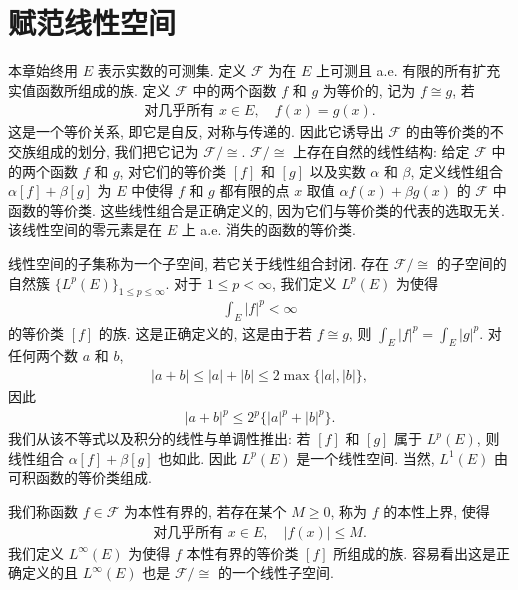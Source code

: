 \documentclass[../../main.tex]{subfiles}
\begin{document}
\section{赋范线性空间}\label{section:ch07-赋范线性空间}

本章始终用 $E$ 表示实数的可测集. 定义 $\mathcal{F}$ 为在 $E$ 上可测且 a.e. 有限的所有扩充实值函数所组成的族. 定义 $\mathcal{F}$ 中的两个函数 $f$ 和 $g$ 为等价的, 记为 $f\cong g$, 若
\begin{align*}
\text{对几乎所有 }x\in E,\quad f(x)=g(x).
\end{align*}
这是一个等价关系, 即它是自反, 对称与传递的. 因此它诱导出 $\mathcal{F}$ 的由等价类的不交族组成的划分, 我们把它记为 $\mathcal{F}/\cong$. $\mathcal{F}/\cong$ 上存在自然的线性结构: 给定 $\mathcal{F}$ 中的两个函数 $f$ 和 $g$, 对它们的等价类 $[f]$ 和 $[g]$ 以及实数 $\alpha$ 和 $\beta$, 定义线性组合 $\alpha[f]+\beta[g]$ 为 $E$ 中使得 $f$ 和 $g$ 都有限的点 $x$ 取值 $\alpha f(x)+\beta g(x)$ 的 $\mathcal{F}$ 中函数的等价类. 这些线性组合是正确定义的, 因为它们与等价类的代表的选取无关. 该线性空间的零元素是在 $E$ 上 a.e. 消失的函数的等价类.

线性空间的子集称为一个子空间, 若它关于线性组合封闭. 存在 $\mathcal{F}/\cong$ 的子空间的自然簇 $\{L^{p}(E)\}_{1\leqslant p\leqslant\infty}$. 对于 $1\leqslant p<\infty$, 我们定义 $L^{p}(E)$ 为使得
\begin{align*}
\int_{E}|f|^{p}<\infty
\end{align*}
的等价类 $[f]$ 的族. 这是正确定义的, 这是由于若 $f\cong g$, 则 $\int_{E}|f|^{p}=\int_{E}|g|^{p}$. 对任何两个数 $a$ 和 $b$,
\begin{align*}
|a+b|\leqslant|a|+|b|\leqslant 2\max\{|a|,|b|\},
\end{align*}
因此
\begin{align}
|a+b|^{p}\leqslant 2^{p}\{|a|^{p}+|b|^{p}\}.\label{align:ch07-三角不等式估计}
\end{align}
我们从该不等式以及积分的线性与单调性推出: 若 $[f]$ 和 $[g]$ 属于 $L^{p}(E)$, 则线性组合 $\alpha[f]+\beta[g]$ 也如此. 因此 $L^{p}(E)$ 是一个线性空间. 当然, $L^{1}(E)$ 由可积函数的等价类组成.

我们称函数 $f\in\mathcal{F}$ 为本性有界的, 若存在某个 $M\geqslant 0$, 称为 $f$ 的本性上界, 使得
\begin{align*}
\text{对几乎所有 }x\in E,\quad |f(x)|\leqslant M.
\end{align*}
我们定义 $L^{\infty}(E)$ 为使得 $f$ 本性有界的等价类 $[f]$ 所组成的族. 容易看出这是正确定义的且 $L^{\infty}(E)$ 也是 $\mathcal{F}/\cong$ 的一个线性子空间.
\end{document}
